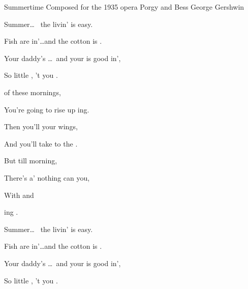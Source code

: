 \begin{SBSong}{Summertime}
  {Composed for the 1935 opera Porgy and Bess}
  {George Gershwin}
  \begin{SBVerse}
    Summer\ldots\  the livin' is  easy.
    
    Fish are in'\ldots and the cotton is .
    
    Your daddy's \ldots\ and your  is good in',
    
    So  little , 't you .
  \end{SBVerse}
  \begin{SBChorus}
     of these mornings, 
    
    You're going to rise up ing.
    
    Then you'll  your wings,
    
    And you'll take to the .
    
    But till  morning, 
    
    There's a' nothing can  you,
    
    With  and 
    
    ing .
  \end{SBChorus}
  \WBPageBrk
  \begin{SBVerse}
    Summer\ldots\  the livin' is  easy.
    
    Fish are in'\ldots and the cotton is .
    
    Your daddy's \ldots\ and your  is good in',
    
    So  little , 't you .
  \end{SBVerse}
\end{SBSong}
